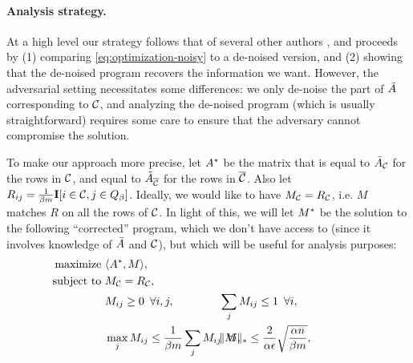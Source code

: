\paragraph{Analysis strategy.}
At a high level our strategy follows that of several other authors 
\citep{todo}, and proceeds by (1) comparing \eqref{eq:optimization-noisy} to a 
de-noised version, and (2) showing that the de-noised program recovers the 
information we want. However, the adversarial setting necessitates some 
differences: we only de-noise the part of $\tilde{A}$ corresponding to $\mathcal{C}$, 
and analyzing the de-noised program (which is usually straightforward) requires 
some care to ensure that the adversary cannot compromise the solution.

To make our approach more precise, let $A^*$ be the matrix that is equal to 
$\bar{A}_{\mathcal{C}}$ for the rows in $\mathcal{C}$, 
and equal to $\tilde{A}_{\overline{\mathcal{C}}}$ for the rows in $\overline{\mathcal{C}}$. Also let 
$R_{ij} = \frac{1}{\beta m}\mathbf{I}[i \in \mathcal{C}, j \in Q_{\beta}]$. 
Ideally, we would like to have $M_{\mathcal{C}} = R_{\mathcal{C}}$, i.e. $M$ matches $R$ on 
all the rows of $\mathcal{C}$. In light of this, 
we will let $M^*$ be the solution to the following ``corrected'' program, which 
we don't have access to (since it involves knowledge of $\bar{A}$ and $\mathcal{C}$), 
but which will be useful for analysis purposes:
\begin{align}
\label{eq:optimization-noiseless}
\text{maximize } &\langle \Aa, M \rangle, \\
\notag \text{ subject to } &M_{\good} = R_{\good}, \\
\notag  &M_{ij} \geq 0 \,\,\, \forall i,j, 
  &&\hskip-0.4in\sum_j M_{ij} \leq 1 \,\,\, \forall i, \\
\notag  &\max_j M_{ij} \leq \frac{1}{\beta m}\sum_j M_{ij} \,\,\, \forall i, 
  &&\hskip-0.4in\|M\|_* \leq \frac{2}{\alpha\epsilon}\sqrt{\frac{\alpha n}{\beta m}}, \phantom{xxxxxxx}
\end{align}

